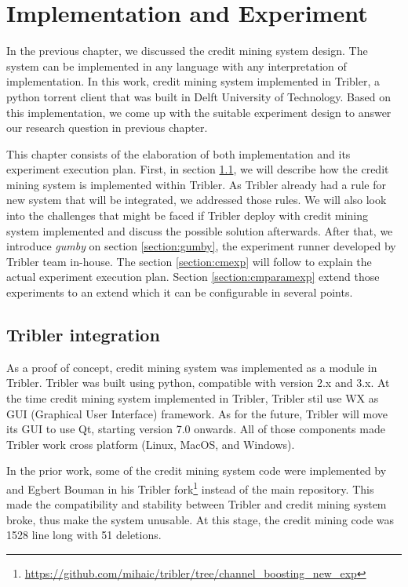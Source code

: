 \chapter{Implementation and Experiment}
\label{chp:implexperiment}
In the previous chapter, we discussed the credit mining system design. The system can be implemented in any language with any interpretation of implementation. In this work, credit mining system implemented in Tribler, a python torrent client that was built in Delft University of Technology. Based on this implementation, we come up with the suitable experiment design to answer our research question in previous chapter. 

This chapter consists of the elaboration of both implementation and its experiment execution plan. First, in section \ref{section:triblerintregration}, we will describe how the credit mining system is implemented within Tribler. As Tribler already had a rule for new system that will be integrated, we addressed those rules. We will also look into the challenges that might be faced if Tribler deploy with credit mining system implemented and discuss the possible solution afterwards. After that, we introduce \textit{gumby} on section \ref{section:gumby}, the experiment runner developed by Tribler team in-house. The section \ref{section:cmexp} will follow to explain the actual experiment execution plan. Section \ref{section:cmparamexp} extend those experiments to an extend which it can be configurable in several points.

\section{Tribler integration}
\label{section:triblerintregration}
As a proof of concept, credit mining system was implemented as a module in Tribler. Tribler was built using python, compatible with version 2.x and 3.x. At the time credit mining system implemented in Tribler, Tribler stil use WX as GUI (Graphical User Interface) framework. As for the future, Tribler will move its GUI to use Qt, starting version 7.0 onwards. All of those components made Tribler work cross platform (Linux, MacOS, and Windows).

In the prior work, some of the credit mining system code were implemented by \citeauthor{2015:creditmining:capota} and Egbert Bouman in his Tribler fork\footnote{\url{https://github.com/mihaic/tribler/tree/channel_boosting_new_exp}} instead of the main repository. This made the compatibility and stability between Tribler and credit mining system broke, thus make the system unusable. At this stage, the credit mining code was 1528 line long with 51 deletions.

